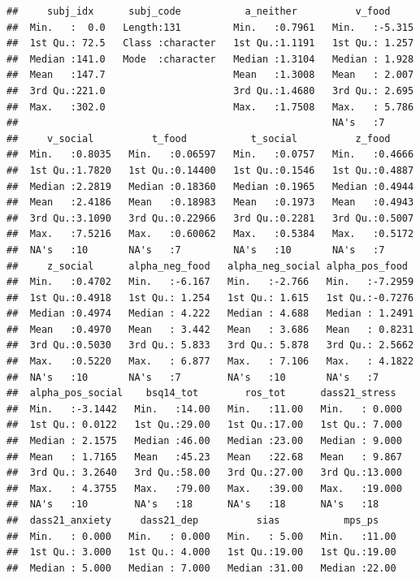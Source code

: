 \documentclass[
]{article}
\begin{document}
\begin{verbatim}
##     subj_idx      subj_code           a_neither          v_food      
##  Min.   :  0.0   Length:131         Min.   :0.7961   Min.   :-5.315  
##  1st Qu.: 72.5   Class :character   1st Qu.:1.1191   1st Qu.: 1.257  
##  Median :141.0   Mode  :character   Median :1.3104   Median : 1.928  
##  Mean   :147.7                      Mean   :1.3008   Mean   : 2.007  
##  3rd Qu.:221.0                      3rd Qu.:1.4680   3rd Qu.: 2.695  
##  Max.   :302.0                      Max.   :1.7508   Max.   : 5.786  
##                                                      NA's   :7       
##     v_social          t_food           t_social          z_food      
##  Min.   :0.8035   Min.   :0.06597   Min.   :0.0757   Min.   :0.4666  
##  1st Qu.:1.7820   1st Qu.:0.14400   1st Qu.:0.1546   1st Qu.:0.4887  
##  Median :2.2819   Median :0.18360   Median :0.1965   Median :0.4944  
##  Mean   :2.4186   Mean   :0.18983   Mean   :0.1973   Mean   :0.4943  
##  3rd Qu.:3.1090   3rd Qu.:0.22966   3rd Qu.:0.2281   3rd Qu.:0.5007  
##  Max.   :7.5216   Max.   :0.60062   Max.   :0.5384   Max.   :0.5172  
##  NA's   :10       NA's   :7         NA's   :10       NA's   :7       
##     z_social      alpha_neg_food   alpha_neg_social alpha_pos_food   
##  Min.   :0.4702   Min.   :-6.167   Min.   :-2.766   Min.   :-7.2959  
##  1st Qu.:0.4918   1st Qu.: 1.254   1st Qu.: 1.615   1st Qu.:-0.7276  
##  Median :0.4974   Median : 4.222   Median : 4.688   Median : 1.2491  
##  Mean   :0.4970   Mean   : 3.442   Mean   : 3.686   Mean   : 0.8231  
##  3rd Qu.:0.5030   3rd Qu.: 5.833   3rd Qu.: 5.878   3rd Qu.: 2.5662  
##  Max.   :0.5220   Max.   : 6.877   Max.   : 7.106   Max.   : 4.1822  
##  NA's   :10       NA's   :7        NA's   :10       NA's   :7        
##  alpha_pos_social    bsq14_tot        ros_tot      dass21_stress   
##  Min.   :-3.1442   Min.   :14.00   Min.   :11.00   Min.   : 0.000  
##  1st Qu.: 0.0122   1st Qu.:29.00   1st Qu.:17.00   1st Qu.: 7.000  
##  Median : 2.1575   Median :46.00   Median :23.00   Median : 9.000  
##  Mean   : 1.7165   Mean   :45.23   Mean   :22.68   Mean   : 9.867  
##  3rd Qu.: 3.2640   3rd Qu.:58.00   3rd Qu.:27.00   3rd Qu.:13.000  
##  Max.   : 4.3755   Max.   :79.00   Max.   :39.00   Max.   :19.000  
##  NA's   :10        NA's   :18      NA's   :18      NA's   :18      
##  dass21_anxiety     dass21_dep          sias           mps_ps     
##  Min.   : 0.000   Min.   : 0.000   Min.   : 5.00   Min.   :11.00  
##  1st Qu.: 3.000   1st Qu.: 4.000   1st Qu.:19.00   1st Qu.:19.00  
##  Median : 5.000   Median : 7.000   Median :31.00   Median :22.00  

\end{verbatim}
\end{document}
